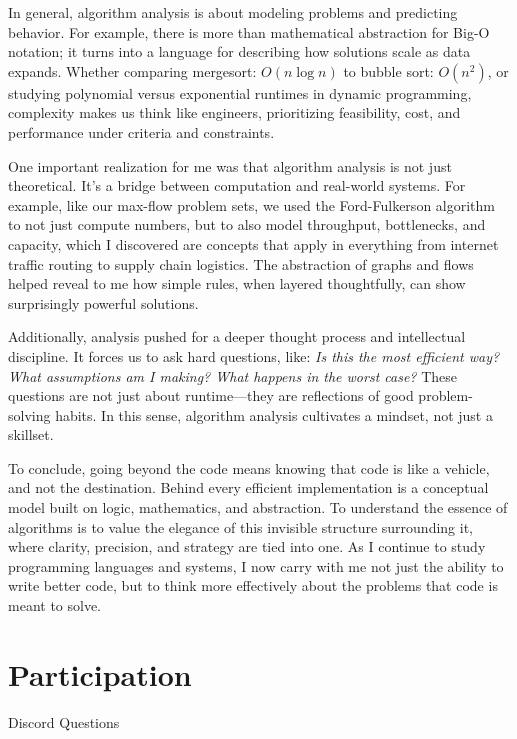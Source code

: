 \documentclass[11pt]{article}
\begin{document}
In general, algorithm analysis is about modeling problems and predicting behavior. For example, there is more than mathematical abstraction for Big-O notation; it turns into a language for describing how solutions scale as data expands. Whether comparing mergesort: \( O(n \log n) \) to bubble sort: \( O(n^2) \), or studying polynomial versus exponential runtimes in dynamic programming, complexity makes us think like engineers, prioritizing feasibility, cost, and performance under criteria and constraints.

One important realization for me was that algorithm analysis is not just theoretical. It’s a bridge between computation and real-world systems. For example, like our max-flow problem sets, we used the Ford-Fulkerson algorithm to not just compute numbers, but to also model throughput, bottlenecks, and capacity, which I discovered are concepts that apply in everything from internet traffic routing to supply chain logistics. The abstraction of graphs and flows helped reveal to me how simple rules, when layered thoughtfully, can show surprisingly powerful solutions.

Additionally, analysis pushed for a deeper thought process and intellectual discipline. It forces us to ask hard questions, like: \textit{Is this the most efficient way? What assumptions am I making? What happens in the worst case?} These questions are not just about runtime—they are reflections of good problem-solving habits. In this sense, algorithm analysis cultivates a mindset, not just a skillset.

To conclude, going beyond the code means knowing that code is like a vehicle, and not the destination. Behind every efficient implementation is a conceptual model built on logic, mathematics, and abstraction. To understand the essence of algorithms is to value the elegance of this invisible structure surrounding it, where clarity, precision, and strategy are tied into one. As I continue to study programming languages and systems, I now carry with me not just the ability to write better code, but to think more effectively about the problems that code is meant to solve.

\section{Participation}

Discord Questions
\end{document}
